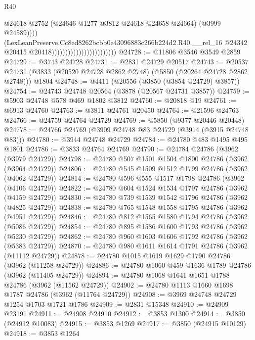 \begin{lexlean}{R40}
\begin{coremodule}
                                                        @24618
                                                        @2752
                                                        (@24646 @1277 @3812 @24618 @24658 @24664)
                                                        (@3999 @24589))))
                                                  (LexLeanPreserve.Cc8ed8262bcbb0e43096883c266b224d2.R40.__rel_16
                                                    @24342
                                                    @20415
                                                    @20418))))))))))))))))))))))))
@24728 := @11806 @3546 @3549 @2859
@24729 := @3743 @24728
@24731 := @2831 @24729 @20517
@24743 := @20537
    @24731
    (@3833 (@20520 @24728 @2862 @2748) (@5850 (@20264 @24728 @2862 @2748)))
    @1804
@24748 := @4411 (@20556 (@3850 (@3854 @24729) @3857))
@24754 := @24743 @24748 @20564 (@3878 (@20567 @24731 @3857))
@24759 := @5903 @24748 @578 @469 @1802 @3812
@24760 := @20818 @19
@24761 := @6913 @24760
@24763 := @3811 @24761 @20450
@24764 := @21596 @24763
@24766 := @24759 @24764 @24729
@24769 := @5850 (@9377 @20446 @20448)
@24778 := @24766 @24769 (@3909 @24748 @83 @24729 (@3914 (@3915 @24748 @83)))
@24780 := @3944 @24748 @24729
@24784 := @24780 @483 @1495 @495 @1801
@24786 := @3833 @24764 @24769
@24790 := @24784 @24786 (@3962 (@3979 @24729))
@24798 := @24780 @507 @1501 @1504 @1800 @24786 (@3962 (@3964 @24729))
@24806 := @24780 @545 @1509 @1512 @1799 @24786 (@3962 (@4062 @24729))
@24814 := @24780 @596 @555 @1517 @1798 @24786 (@3962 (@4106 @24729))
@24822 := @24780 @604 @1524 @1534 @1797 @24786 (@3962 (@4159 @24729))
@24830 := @24780 @739 @1539 @1542 @1796 @24786 (@3962 (@4825 @24729))
@24838 := @24780 @765 @1548 @1558 @1795 @24786 (@3962 (@4951 @24729))
@24846 := @24780 @812 @1565 @1580 @1794 @24786 (@3962 (@5086 @24729))
@24854 := @24780 @895 @1586 @1600 @1793 @24786 (@3962 (@5230 @24729))
@24862 := @24780 @960 @1603 @1606 @1792 @24786 (@3962 (@5383 @24729))
@24870 := @24780 @980 @1611 @1614 @1791 @24786 (@3962 (@11112 @24729))
@24878 := @24780 @1015 @1619 @1629 @1790 @24786 (@3962 (@11258 @24729))
@24886 := @24780 @1060 @459 @1636 @1789 @24786 (@3962 (@11405 @24729))
@24894 := @24780 @1068 @1641 @1651 @1788 @24786 (@3962 (@11562 @24729))
@24902 := @24780 @1113 @1660 @1698 @1787 @24786 (@3962 (@11764 @24729))
@24908 := @3969 @24748 @24729 @1254 @1703 @1721 @1786
@24909 := @2831 @15348
@24910 := @24909 @23191
@24911 := @24908 @24910
@24912 := @3853 @1300
@24914 := @3850 (@24912 @10083)
@24915 := @3853 @1269
@24917 := @3850 (@24915 @10129)
@24918 := @3853 @1264

\end{coremodule}
\end{lexlean}
